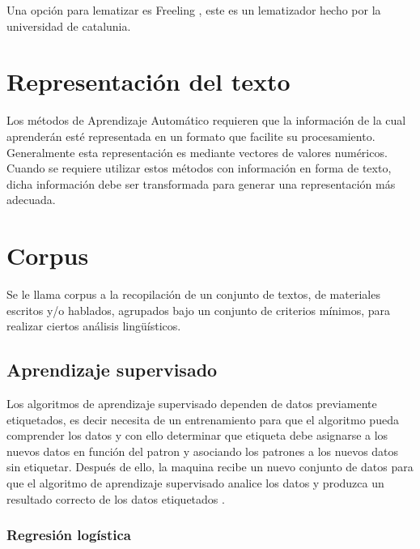 Una opción para lematizar es Freeling \citep{CT18}, este es un lematizador hecho por la
universidad de catalunia.



\section[Representación del t.]{Representación del texto}
Los métodos de Aprendizaje Automático requieren que la información de la cual aprenderán esté representada en un
formato que facilite su procesamiento. Generalmente esta representación es mediante vectores de valores numéricos. 
Cuando se requiere utilizar estos métodos con información en forma de texto, dicha
información debe ser transformada para generar una representación más adecuada. 

\section{Corpus}

Se le llama corpus a la recopilación de un conjunto de textos, de materiales escritos y/o hablados, 
agrupados bajo un conjunto de criterios mínimos, para realizar ciertos análisis lingüísticos.




\subsection{Aprendizaje supervisado}

Los algoritmos de aprendizaje supervisado dependen de datos previamente etiquetados, es decir necesita de un entrenamiento para 
que el algoritmo pueda comprender los datos y con ello determinar que etiqueta debe asignarse a los nuevos datos 
en función del patron y asociando los patrones a los nuevos datos sin etiquetar. Después de ello, la maquina recibe 
un nuevo conjunto de datos para que el algoritmo de aprendizaje supervisado analice los datos y produzca un resultado 
correcto de los datos etiquetados \citep{CT4}.


\subsubsection{Regresión logística}

